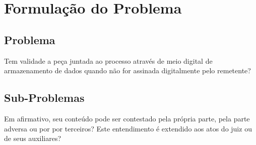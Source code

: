 \chapter{Formulação do Problema}

\section{Problema}
Tem validade a peça juntada ao processo através de meio digital de armazenamento de dados quando não for assinada digitalmente pelo remetente?

\section{Sub-Problemas}
Em afirmativo, seu conteúdo pode ser contestado pela própria parte, pela parte adversa ou por por terceiros? Este entendimento é extendido aos atos do juiz ou de seus auxiliares?
